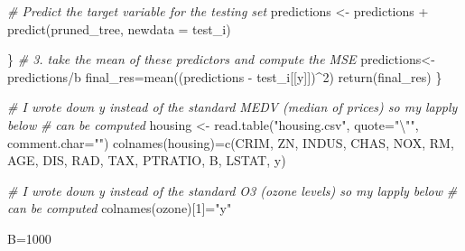 \documentclass[
]{article}
\newenvironment{Shaded}{\begin{snugshade}}{\end{snugshade}}
\newcommand{\AttributeTok}[1]{\textcolor[rgb]{0.77,0.63,0.00}{#1}}
\newcommand{\CommentTok}[1]{\textcolor[rgb]{0.56,0.35,0.01}{\textit{#1}}}
\newcommand{\DecValTok}[1]{\textcolor[rgb]{0.00,0.00,0.81}{#1}}
\newcommand{\FunctionTok}[1]{\textcolor[rgb]{0.00,0.00,0.00}{#1}}
\newcommand{\NormalTok}[1]{#1}
\newcommand{\OtherTok}[1]{\textcolor[rgb]{0.56,0.35,0.01}{#1}}
\newcommand{\SpecialCharTok}[1]{\textcolor[rgb]{0.00,0.00,0.00}{#1}}
\newcommand{\StringTok}[1]{\textcolor[rgb]{0.31,0.60,0.02}{#1}}
\begin{document}
\begin{Shaded}
\begin{Highlighting}[]
  \CommentTok{\# Predict the target variable for the testing set}
\NormalTok{  predictions }\OtherTok{\textless{}{-}}\NormalTok{ predictions }\SpecialCharTok{+} \FunctionTok{predict}\NormalTok{(pruned\_tree, }\AttributeTok{newdata =}\NormalTok{ test\_i)}
   
\NormalTok{  \}}
  \CommentTok{\# 3. take the mean of these predictors and compute the MSE}
\NormalTok{  predictions}\OtherTok{\textless{}{-}}\NormalTok{predictions}\SpecialCharTok{/}\NormalTok{b}
\NormalTok{  final\_res}\OtherTok{=}\FunctionTok{mean}\NormalTok{((predictions }\SpecialCharTok{{-}}\NormalTok{ test\_i[[y]])}\SpecialCharTok{\^{}}\DecValTok{2}\NormalTok{)}
  \FunctionTok{return}\NormalTok{(final\_res)}
\NormalTok{\}}

\CommentTok{\# I wrote down y instead of the standard MEDV (median of prices) so my lapply below}
\CommentTok{\# can be computed}
\NormalTok{housing }\OtherTok{\textless{}{-}} \FunctionTok{read.table}\NormalTok{(}\StringTok{"housing.csv"}\NormalTok{, }\AttributeTok{quote=}\StringTok{"}\SpecialCharTok{\textbackslash{}"}\StringTok{"}\NormalTok{, }\AttributeTok{comment.char=}\StringTok{""}\NormalTok{)}
\FunctionTok{colnames}\NormalTok{(housing)}\OtherTok{=}\FunctionTok{c}\NormalTok{(}\StringTok{\textquotesingle{}CRIM\textquotesingle{}}\NormalTok{, }\StringTok{\textquotesingle{}ZN\textquotesingle{}}\NormalTok{, }\StringTok{\textquotesingle{}INDUS\textquotesingle{}}\NormalTok{, }\StringTok{\textquotesingle{}CHAS\textquotesingle{}}\NormalTok{, }\StringTok{\textquotesingle{}NOX\textquotesingle{}}\NormalTok{, }\StringTok{\textquotesingle{}RM\textquotesingle{}}\NormalTok{, }\StringTok{\textquotesingle{}AGE\textquotesingle{}}\NormalTok{, }\StringTok{\textquotesingle{}DIS\textquotesingle{}}\NormalTok{,}
                    \StringTok{\textquotesingle{}RAD\textquotesingle{}}\NormalTok{, }\StringTok{\textquotesingle{}TAX\textquotesingle{}}\NormalTok{, }\StringTok{\textquotesingle{}PTRATIO\textquotesingle{}}\NormalTok{, }\StringTok{\textquotesingle{}B\textquotesingle{}}\NormalTok{, }\StringTok{\textquotesingle{}LSTAT\textquotesingle{}}\NormalTok{, }\StringTok{\textquotesingle{}y\textquotesingle{}}\NormalTok{)}

\CommentTok{\# I wrote down y instead of the standard O3 (ozone levels) so my lapply below}
\CommentTok{\# can be computed}
\FunctionTok{colnames}\NormalTok{(ozone)[}\DecValTok{1}\NormalTok{]}\OtherTok{=}\StringTok{"y"}

\NormalTok{B}\OtherTok{=}\DecValTok{1000}


\end{Highlighting}
\end{Shaded}
\end{document}
